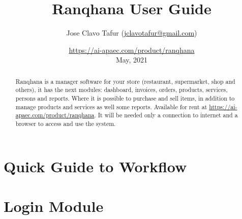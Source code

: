 \documentclass[a4paper,11pt]{refart}
\title{Ranqhana User Guide}
\author{Jose Clavo Tafur (\url{jclavotafur@gmail.com})}
\date{\url{https://ai-apaec.com/product/ranqhana}\\May, 2021}
\newcommand\Ranqhana{\textsf{Ranqhana}}
\begin{document}
\maketitle

\begin{abstract}
 \Ranqhana{} is a manager software for your store (restaurant, supermarket, shop and others), it has the next modules: dashboard, invoices, orders, products, services, persons and reports. Where it is possible to purchase and sell items, in addition to manage products and services as well some reports. Available for rent at \url{https://ai-apaec.com/product/ranqhana}. It will be needed only a connection to internet and a browser to access and use the system.
\end{abstract}

\tableofcontents
\clearpage

\section*{Quick Guide to Workflow}


%


\section{Login Module}
\end{document}
